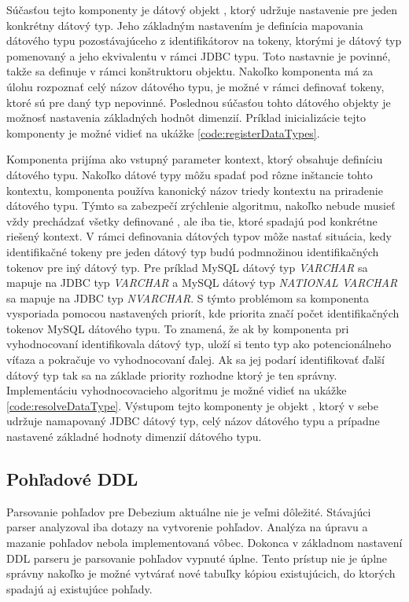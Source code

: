 Súčasťou tejto komponenty je dátový objekt , ktorý udržuje nastavenie pre jeden konkrétny dátový typ. Jeho základným nastavením je definícia mapovania dátového typu pozostávajúceho z identifikátorov na tokeny, ktorými je dátový typ pomenovaný a jeho ekvivalentu v rámci JDBC typu. Toto nastavnie je povinné, takže sa definuje v rámci konštruktoru  objektu. Nakoľko komponenta  má za úlohu rozpoznať celý názov dátového typu, je možné v rámci  definovať tokeny, ktoré sú pre daný typ nepovinné. Poslednou súčasťou tohto dátového objekty je možnosť nastavenia základných hodnôt dimenzií. Príklad inicializácie tejto komponenty je možné vidieť na ukážke \ref{code:registerDataTypes}.

Komponenta  prijíma ako vstupný parameter kontext, ktorý obsahuje definíciu dátového typu. Nakoľko dátové typy môžu spadať pod rôzne inštancie tohto kontextu, komponenta používa kanonický názov triedy kontextu na priradenie dátového typu. Týmto sa zabezpečí zrýchlenie algoritmu, nakoľko  nebude musieť vždy prechádzať všetky definované , ale iba tie, ktoré spadajú pod konkrétne riešený kontext. V rámci definovania dátových typov môže nastať situácia, kedy identifikačné tokeny pre jeden dátový typ budú podmnožinou identifikačných tokenov pre iný dátový typ. Pre príklad MySQL dátový typ \textit{VARCHAR} sa mapuje na  JDBC typ \textit{VARCHAR} a MySQL dátový typ \textit{NATIONAL VARCHAR} sa mapuje na JDBC typ \textit{NVARCHAR}. S týmto problémom sa komponenta vysporiada pomocou nastavených priorít, kde priorita značí počet identifikačných tokenov MySQL dátového typu. To znamená, že ak by komponenta pri vyhodnocovaní identifikovala dátový typ, uloží si tento typ ako potencionálneho víťaza a pokračuje vo vyhodnocovaní ďalej. Ak sa jej podarí identifikovať ďalší dátový typ tak sa na základe priority rozhodne ktorý je ten správny. Implementáciu vyhodnocovacieho algoritmu je možné vidieť na ukážke \ref{code:resolveDataType}. Výstupom tejto komponenty je objekt , ktorý v sebe udržuje namapovaný JDBC dátový typ, celý názov dátového typu a prípadne nastavené základné hodnoty dimenzií dátového typu.

\subsection{Pohľadové DDL}
Parsovanie pohľadov pre Debezium aktuálne nie je veľmi dôležité. Stávajúci parser analyzoval iba dotazy na vytvorenie pohľadov. Analýza na úpravu a mazanie pohľadov nebola implementovaná vôbec. Dokonca v základnom nastavení DDL parseru je parsovanie pohľadov vypnuté úplne. Tento prístup nie je úplne správny nakoľko je možné vytvárať nové tabuľky kópiou existujúcich, do ktorých spadajú aj existujúce pohľady.

